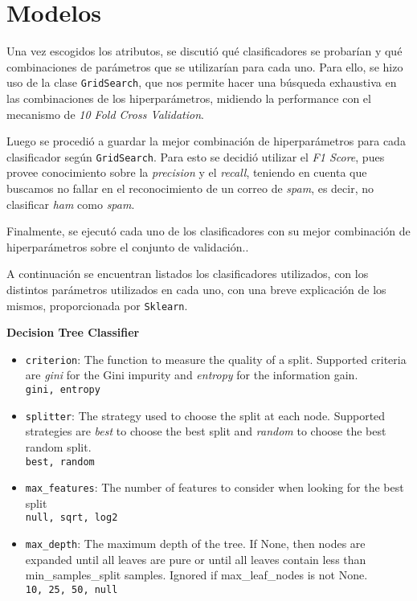 \section{Modelos}

Una vez escogidos los atributos, se discutió qué clasificadores se probarían y qué combinaciones de parámetros que se utilizar\'ian para cada uno. Para ello, se hizo uso de la clase \texttt{GridSearch}\textsuperscript{\cite{gridsearch}}, que nos permite hacer una b\'usqueda exhaustiva en las combinaciones de los hiperpar\'ametros, midiendo la performance con el mecanismo de \emph{10 Fold Cross Validation}.

Luego se procedió a guardar la mejor combinación de hiperparámetros para cada clasificador según \texttt{GridSearch}. Para esto se decidió utilizar el \emph{F1 Score}, pues provee conocimiento sobre la \emph{precision} y el \emph{recall}, teniendo en cuenta que buscamos no fallar en el reconocimiento de un correo de \emph{spam}, es decir, no clasificar \emph{ham} como \emph{spam}.

Finalmente, se ejecut\'o cada uno de los clasificadores con su mejor combinación de hiperparámetros sobre el conjunto de validación..

\noindent A continuaci\'on se encuentran listados los clasificadores utilizados, con los distintos par\'ametros utilizados en cada uno, con una breve explicaci\'on de los mismos, proporcionada por \texttt{Sklearn}.

\noindent \textbf{Decision Tree Classifier}
\begin{itemize}
	\item \texttt{criterion}: The function to measure the quality of a split. Supported criteria are \emph{gini} for the Gini impurity and \emph{entropy} for the information gain.\\
	\texttt{gini, entropy}
	\item \texttt{splitter}: The strategy used to choose the split at each node. Supported strategies are \emph{best} to choose the best split and \emph{random} to choose the best random split.\\
	\texttt{best, random}
	\item \texttt{max\_features}: The number of features to consider when looking for the best split\\
	\texttt{null, sqrt, log2}
	\item \texttt{max\_depth}: The maximum depth of the tree. If None, then nodes are expanded until all leaves are pure or until all leaves contain less than min\_samples\_split samples. Ignored if max\_leaf\_nodes is not None.\\
	\texttt{10, 25, 50, null}
\end{itemize}

